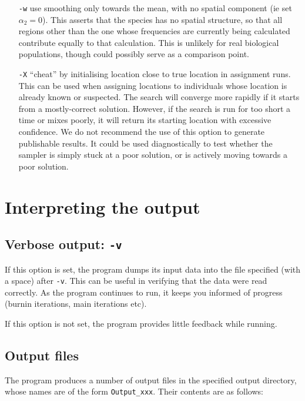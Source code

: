 \documentclass[10pt,titlepage,times,letterpaper]{article}
\begin{document}
\begin{itemize}
\item[{\tt -w}] use smoothing only towards the mean, with no spatial component (ie set
$\alpha_2 = 0$).  This asserts that the species has no spatial 
structure, so that all regions other than the one whose frequencies are
currently being calculated contribute equally to that calculation.  This is
unlikely for real biological populations, though could possibly serve as
a comparison point.

\item[{\tt -X}] ``cheat'' by initialising location close to true location in assignment runs.  
This can be used when assigning locations to 
individuals whose location is already known or suspected.  The search will
converge more rapidly if it starts from a mostly-correct solution.
However, if the search is run for too short a time or mixes poorly, it will
return its starting location with excessive confidence.  We do not recommend
the use of this option to generate publishable results.
It could be used diagnostically to
test whether the sampler is simply stuck at a poor solution, or is actively
moving towards a poor solution.
\end{itemize}



\section{Interpreting the output} \label{interpret}

\subsection{Verbose output: {\tt -v}}

If this option is set, the program dumps its input data into the
file specified (with a space) after {\tt -v}.   This can be useful
in verifying that the data were read correctly.  
As the program continues to run, it keeps you informed of progress
(burnin iterations, main iterations etc). 

If this option is not set, the program provides little feedback while
running.

\subsection{Output files} \label{out}

The program produces a number of output files in the specified output directory,
whose names are of the form {\tt Output\_xxx}. Their
contents are as follows:
\end{document}
